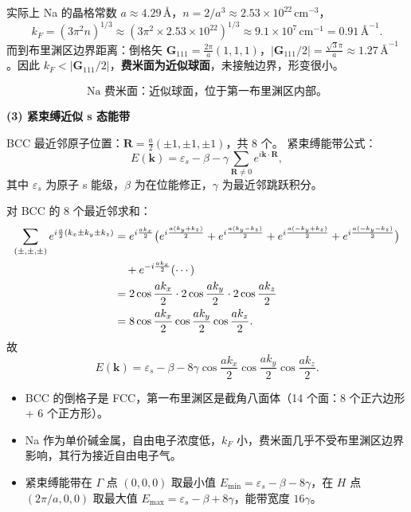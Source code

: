 \begin{derivationbox}[标准解题过程]
实际上 Na 的晶格常数 $a\approx4.29\,\text{\AA}$，$n=2/a^3\approx2.53\times10^{22}\,\text{cm}^{-3}$，
\begin{equation}
k_F=(3\pi^2 n)^{1/3}\approx(3\pi^2\times2.53\times10^{22})^{1/3}\approx9.1\times10^7\,\text{cm}^{-1}=0.91\,\text{\AA}^{-1}.
\end{equation}
而到布里渊区边界距离：倒格矢 $\bm{G}_{111}=\frac{2\pi}{a}(1,1,1)$，$|\bm{G}_{111}/2|=\frac{\sqrt{3}\pi}{a}\approx1.27\,\text{\AA}^{-1}$。因此 $k_F<|\bm{G}_{111}/2|$，\textbf{费米面为近似球面}，未接触边界，形变很小。

\begin{equation}
\boxed{\text{Na 费米面：近似球面，位于第一布里渊区内部。}}
\end{equation}

\textbf{(3) 紧束缚近似 s 态能带}

BCC 最近邻原子位置：$\bm{R}=\frac{a}{2}(\pm1,\pm1,\pm1)$，共 8 个。
紧束缚能带公式：
\begin{equation}
E(\bm{k})=\varepsilon_s-\beta-\gamma\sum_{\bm{R}\neq0}e^{i\bm{k}\cdot\bm{R}},
\end{equation}
其中 $\varepsilon_s$ 为原子 s 能级，$\beta$ 为在位能修正，$\gamma$ 为最近邻跳跃积分。

对 BCC 的 8 个最近邻求和：
\begin{align}
\sum_{(\pm,\pm,\pm)}e^{i\frac{a}{2}(k_x\pm k_y\pm k_z)}
&=e^{i\frac{ak_x}{2}}\bigl(e^{i\frac{a(k_y+k_z)}{2}}+e^{i\frac{a(k_y-k_z)}{2}}+e^{i\frac{a(-k_y+k_z)}{2}}+e^{i\frac{a(-k_y-k_z)}{2}}\bigr)\notag\\
&\quad+e^{-i\frac{ak_x}{2}}(\cdots) \notag\\
&=2\cos\frac{ak_x}{2}\cdot2\cos\frac{ak_y}{2}\cdot2\cos\frac{ak_z}{2}\notag\\
&=8\cos\frac{ak_x}{2}\cos\frac{ak_y}{2}\cos\frac{ak_z}{2}.
\end{align}
故
\begin{equation}
\boxed{E(\bm{k})=\varepsilon_s-\beta-8\gamma\cos\frac{ak_x}{2}\cos\frac{ak_y}{2}\cos\frac{ak_z}{2}.}
\end{equation}
\end{derivationbox}

\begin{insightbox}[物理图像]
\begin{itemize}
    \item BCC 的倒格子是 FCC，第一布里渊区是截角八面体（14 个面：8 个正六边形 + 6 个正方形）。
    \item Na 作为单价碱金属，自由电子浓度低，$k_F$ 小，费米面几乎不受布里渊区边界影响，其行为接近自由电子气。
    \item 紧束缚能带在 $\Gamma$ 点 $(0,0,0)$ 取最小值 $E_{\min}=\varepsilon_s-\beta-8\gamma$，在 $H$ 点 $(2\pi/a,0,0)$ 取最大值 $E_{\max}=\varepsilon_s-\beta+8\gamma$，能带宽度 $16\gamma$。
\end{itemize}
\end{insightbox}
